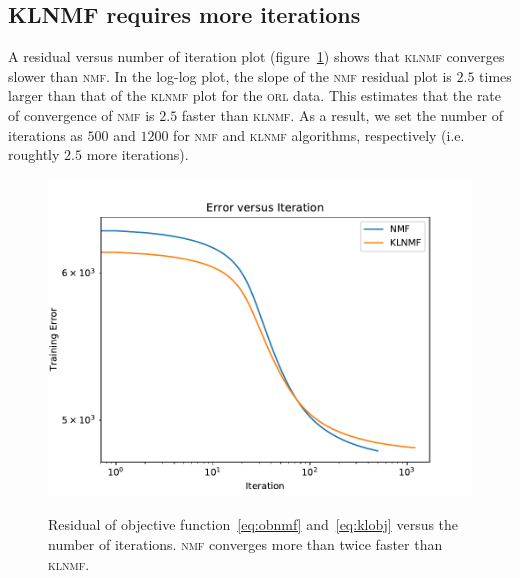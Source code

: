 \subsection{KLNMF requires more iterations}
A residual versus number of iteration plot (figure~\ref{error}) shows that \textsc{klnmf} converges slower than \textsc{nmf}. In the log-log plot, the slope of the \textsc{nmf} residual plot is $2.5$ times larger than that of the \textsc{klnmf} plot for the \textsc{orl} data. This estimates that the rate of convergence of \textsc{nmf} is $2.5$ faster than \textsc{klnmf}. As a result, we set the number of iterations as $500$ and $1200$ for \textsc{nmf} and \textsc{klnmf} algorithms, respectively (i.e. roughtly $2.5$ more iterations).
 \begin{figure}
  \centering
  \includegraphics[scale=.8]{error}\\
  \caption{Residual of objective function~\eqref{eq:obnmf} and~\eqref{eq:klobj} versus the number of iterations. \textsc{nmf} converges more than twice faster than \textsc{klnmf}.}\label{error}
\end{figure}

